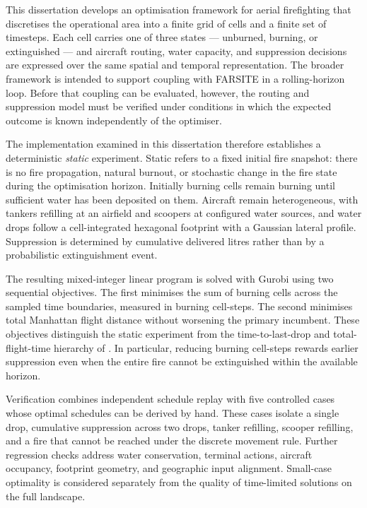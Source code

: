 This dissertation develops an optimisation framework for aerial firefighting that discretises the operational area into a finite grid of cells and a finite set of timesteps. Each cell carries one of three states --- unburned, burning, or extinguished --- and aircraft routing, water capacity, and suppression decisions are expressed over the same spatial and temporal representation. The broader framework is intended to support coupling with FARSITE in a rolling-horizon loop. Before that coupling can be evaluated, however, the routing and suppression model must be verified under conditions in which the expected outcome is known independently of the optimiser.

The implementation examined in this dissertation therefore establishes a deterministic \emph{static} experiment. Static refers to a fixed initial fire snapshot: there is no fire propagation, natural burnout, or stochastic change in the fire state during the optimisation horizon. Initially burning cells remain burning until sufficient water has been deposited on them. Aircraft remain heterogeneous, with tankers refilling at an airfield and scoopers at configured water sources, and water drops follow a cell-integrated hexagonal footprint with a Gaussian lateral profile. Suppression is determined by cumulative delivered litres rather than by a probabilistic extinguishment event.

The resulting mixed-integer linear program is solved with Gurobi using two sequential objectives. The first minimises the sum of burning cells across the sampled time boundaries, measured in burning cell-steps. The second minimises total Manhattan flight distance without worsening the primary incumbent. These objectives distinguish the static experiment from the time-to-last-drop and total-flight-time hierarchy of \citet{chalabi2024affvrp}. In particular, reducing burning cell-steps rewards earlier suppression even when the entire fire cannot be extinguished within the available horizon.

Verification combines independent schedule replay with five controlled cases whose optimal schedules can be derived by hand. These cases isolate a single drop, cumulative suppression across two drops, tanker refilling, scooper refilling, and a fire that cannot be reached under the discrete movement rule. Further regression checks address water conservation, terminal actions, aircraft occupancy, footprint geometry, and geographic input alignment. Small-case optimality is considered separately from the quality of time-limited solutions on the full landscape.

